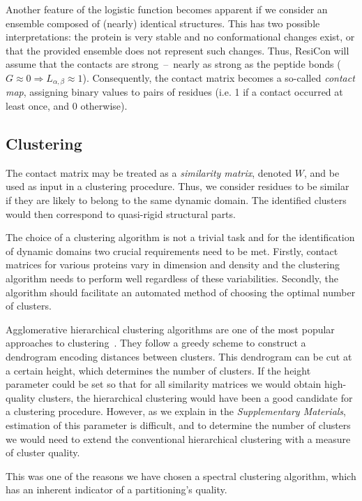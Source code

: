 Another feature of the logistic function becomes apparent if we consider an ensemble composed of (nearly) identical structures.
This has two possible interpretations: the protein is very stable and no conformational changes exist, or that the provided ensemble does not represent such changes.
Thus, ResiCon will assume that the contacts are strong~--~nearly as strong as the peptide bonds ($G\approx 0 \Rightarrow L_{\alpha,\beta}\approx 1$).
Consequently, the contact matrix becomes a so-called \emph{contact map}, assigning binary values to pairs of residues (i.e. 1 if a contact occurred at least once, and 0 otherwise).

\subsection*{Clustering}

The contact matrix may be treated as a \emph{similarity matrix}, denoted $W$, and be used as input in a clustering procedure.
Thus, we consider residues to be similar if they are likely to belong to the same dynamic domain.
The identified clusters would then correspond to quasi-rigid structural parts.

The choice of a clustering algorithm is not a trivial task and for the identification of dynamic domains two crucial requirements need to be met.
Firstly, contact matrices for various proteins vary in dimension and density and the clustering algorithm needs to perform well regardless of these variabilities.
Secondly, the algorithm should facilitate an automated method of choosing the optimal number of clusters. 

Agglomerative hierarchical clustering algorithms are one of the most popular approaches to clustering~\cite{han2001data}.
They follow a greedy scheme to construct a dendrogram encoding distances between clusters.
This dendrogram can be cut at a certain height, which determines the number of clusters.
If the height parameter could be set so that for all similarity matrices we would obtain high-quality clusters, the hierarchical clustering would have been a good candidate for a clustering procedure.
However, as we explain in the \emph{Supplementary Materials}, estimation of this parameter is difficult, and to determine the number of clusters we would need to extend the conventional hierarchical clustering with a measure of cluster quality.

This was one of the reasons we have chosen a spectral clustering algorithm, which has an inherent indicator of a partitioning's quality.

